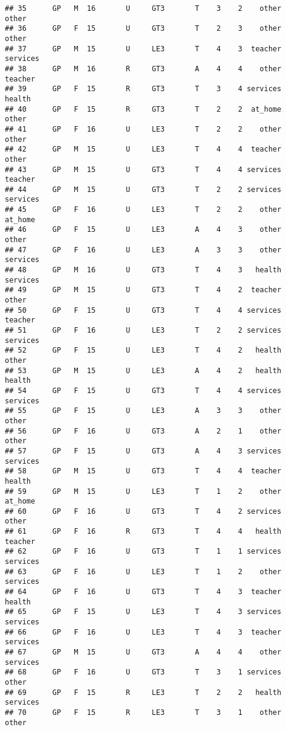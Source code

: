 \documentclass[
]{article}
\begin{document}
\begin{verbatim}
## 35      GP   M  16       U     GT3       T    3    2    other    other
## 36      GP   F  15       U     GT3       T    2    3    other    other
## 37      GP   M  15       U     LE3       T    4    3  teacher services
## 38      GP   M  16       R     GT3       A    4    4    other  teacher
## 39      GP   F  15       R     GT3       T    3    4 services   health
## 40      GP   F  15       R     GT3       T    2    2  at_home    other
## 41      GP   F  16       U     LE3       T    2    2    other    other
## 42      GP   M  15       U     LE3       T    4    4  teacher    other
## 43      GP   M  15       U     GT3       T    4    4 services  teacher
## 44      GP   M  15       U     GT3       T    2    2 services services
## 45      GP   F  16       U     LE3       T    2    2    other  at_home
## 46      GP   F  15       U     LE3       A    4    3    other    other
## 47      GP   F  16       U     LE3       A    3    3    other services
## 48      GP   M  16       U     GT3       T    4    3   health services
## 49      GP   M  15       U     GT3       T    4    2  teacher    other
## 50      GP   F  15       U     GT3       T    4    4 services  teacher
## 51      GP   F  16       U     LE3       T    2    2 services services
## 52      GP   F  15       U     LE3       T    4    2   health    other
## 53      GP   M  15       U     LE3       A    4    2   health   health
## 54      GP   F  15       U     GT3       T    4    4 services services
## 55      GP   F  15       U     LE3       A    3    3    other    other
## 56      GP   F  16       U     GT3       A    2    1    other    other
## 57      GP   F  15       U     GT3       A    4    3 services services
## 58      GP   M  15       U     GT3       T    4    4  teacher   health
## 59      GP   M  15       U     LE3       T    1    2    other  at_home
## 60      GP   F  16       U     GT3       T    4    2 services    other
## 61      GP   F  16       R     GT3       T    4    4   health  teacher
## 62      GP   F  16       U     GT3       T    1    1 services services
## 63      GP   F  16       U     LE3       T    1    2    other services
## 64      GP   F  16       U     GT3       T    4    3  teacher   health
## 65      GP   F  15       U     LE3       T    4    3 services services
## 66      GP   F  16       U     LE3       T    4    3  teacher services
## 67      GP   M  15       U     GT3       A    4    4    other services
## 68      GP   F  16       U     GT3       T    3    1 services    other
## 69      GP   F  15       R     LE3       T    2    2   health services
## 70      GP   F  15       R     LE3       T    3    1    other    other

\end{verbatim}
\end{document}
